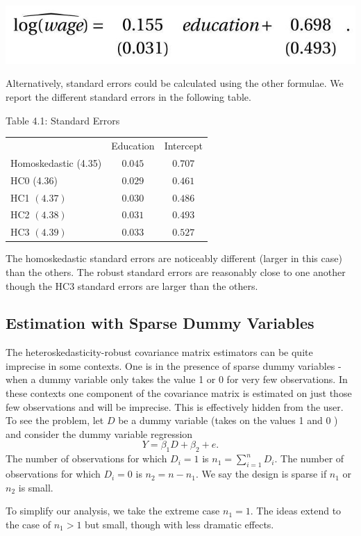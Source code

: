 \documentclass[10pt]{article}
\begin{document}
\includegraphics[max width=\textwidth]{2022_09_17_46fafb30295495354ae2g-20}

Alternatively, standard errors could be calculated using the other formulae. We report the different standard errors in the following table.

Table 4.1: Standard Errors

\begin{tabular}{lcc}
\hline\hline
 & Education & Intercept \\
\cline { 2 - 3 }
Homoskedastic (4.35) & $0.045$ & $0.707$ \\
HC0 (4.36) & $0.029$ & $0.461$ \\
HC1 $(4.37)$ & $0.030$ & $0.486$ \\
HC2 $(4.38)$ & $0.031$ & $0.493$ \\
HC3 $(4.39)$ & $0.033$ & $0.527$ \\
\hline
\end{tabular}

The homoskedastic standard errors are noticeably different (larger in this case) than the others. The robust standard errors are reasonably close to one another though the HC3 standard errors are larger than the others.

\subsection{Estimation with Sparse Dummy Variables}
The heteroskedasticity-robust covariance matrix estimators can be quite imprecise in some contexts. One is in the presence of sparse dummy variables - when a dummy variable only takes the value 1 or 0 for very few observations. In these contexts one component of the covariance matrix is estimated on just those few observations and will be imprecise. This is effectively hidden from the user. To see the problem, let $D$ be a dummy variable (takes on the values 1 and 0 ) and consider the dummy variable regression
$$
Y=\beta_{1} D+\beta_{2}+e .
$$
The number of observations for which $D_{i}=1$ is $n_{1}=\sum_{i=1}^{n} D_{i}$. The number of observations for which $D_{i}=0$ is $n_{2}=n-n_{1}$. We say the design is sparse if $n_{1}$ or $n_{2}$ is small.

To simplify our analysis, we take the extreme case $n_{1}=1$. The ideas extend to the case of $n_{1}>1$ but small, though with less dramatic effects.
\end{document}
